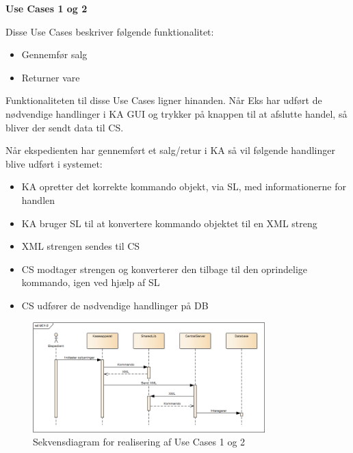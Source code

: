\textbf{Use Cases 1 og 2}

Disse Use Cases beskriver følgende funktionalitet:
\begin{itemize}
	\item Gennemfør salg
	\item Returner vare
\end{itemize}
Funktionaliteten til disse Use Cases ligner hinanden. Når \gls{Eks} har udført de nødvendige
handlinger i \gls{KA} \gls{GUI} og trykker på knappen til at afslutte handel, så bliver der sendt data til \gls{CS}.

Når ekspedienten har gennemført et salg/retur i \gls{KA} så vil følgende
handlinger blive udført i systemet:
\begin{itemize}
	\item \gls{KA} opretter det korrekte kommando objekt, via \gls{SL}, med informationerne for handlen
	\item \gls{KA} bruger \gls{SL} til at konvertere kommando objektet til en XML streng
	\item XML strengen sendes til \gls{CS}
	\item \gls{CS} modtager strengen og konverterer den tilbage til den oprindelige kommando, igen ved hjælp af \gls{SL}
	\item \gls{CS} udfører de nødvendige handlinger på \gls{DB}
\end{itemize}

\begin{figure}[H]
	\centering
	\includegraphics[width=0.8\textwidth]{Systemarkitektur/LogiskView/Realiseringer/Images/UC12.png}
	\caption{Sekvensdiagram for realisering af Use Cases 1 og 2}
	\label{fig:uc38sq}
\end{figure}

